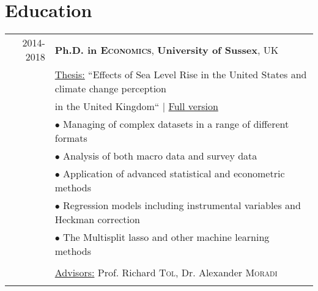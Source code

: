 \documentclass[a4paper,10pt]{article}
\begin{document}
\section{Education}
\begin{tabular}{rl}	
 2014-2018 & \textbf{Ph.D. in \textsc{Economics}}, \textbf{University of Sussex}, UK\\
& \underline{Thesis:} ``Effects of Sea Level Rise in the United States and climate change perception\\

& in the United Kingdom`` \hfill | \href{http://sro.sussex.ac.uk/76891/}{Full version}\\
& \hspace{0.5cm} $\bullet$ Managing of complex datasets in a range of different formats\\
& \hspace{0.5cm} $\bullet$ Analysis of both macro data and survey data\\
& \hspace{0.5cm} $\bullet$ Application of advanced statistical and econometric methods\\
& \hspace{0.5cm} $\bullet$ Regression models including instrumental
variables and Heckman correction\\
& \hspace{0.5cm} $\bullet$ The Multisplit lasso and other machine learning methods\\
\\
& \underline{Advisors:} Prof. Richard \textsc{Tol}, Dr. Alexander \textsc{Moradi}\\&\\


\end{tabular}



\end{document}

